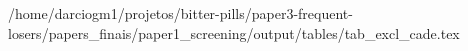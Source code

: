 /home/darciogm1/projetos/bitter-pills/paper3-frequent-losers/papers_finais/paper1_screening/output/tables/tab_excl_cade.tex